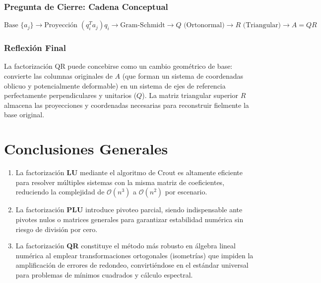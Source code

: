 \documentclass[11pt,a4paper]{article}
\theoremstyle{definition}
\theoremstyle{remark}
\begin{document}
\subsubsection{Pregunta de Cierre: Cadena Conceptual}
\begin{equation}
    \boxed{\text{Base } \{a_j\}} \longrightarrow 
    \boxed{\text{Proyección } (q_i^T a_j)q_i} \longrightarrow 
    \boxed{\text{Gram-Schmidt}} \longrightarrow 
    \boxed{Q \text{ (Ortonormal)}} \longrightarrow 
    \boxed{R \text{ (Triangular)}} \longrightarrow 
    \boxed{A = QR}
\end{equation}

\subsubsection{Reflexión Final}
La factorización QR puede concebirse como un cambio geométrico de base: convierte las columnas originales de $A$ (que forman un sistema de coordenadas oblicuo y potencialmente deformable) en un sistema de ejes de referencia perfectamente perpendiculares y unitarios ($Q$). La matriz triangular superior $R$ almacena las proyecciones y coordenadas necesarias para reconstruir fielmente la base original.

\section{Conclusiones Generales}
\begin{enumerate}
    \item La factorización \textbf{LU} mediante el algoritmo de Crout es altamente eficiente para resolver múltiples sistemas con la misma matriz de coeficientes, reduciendo la complejidad de $\mathcal{O}(n^3)$ a $\mathcal{O}(n^2)$ por escenario.
    \item La factorización \textbf{PLU} introduce pivoteo parcial, siendo indispensable ante pivotes nulos o matrices generales para garantizar estabilidad numérica sin riesgo de división por cero.
    \item La factorización \textbf{QR} constituye el método más robusto en álgebra lineal numérica al emplear transformaciones ortogonales (isometrías) que impiden la amplificación de errores de redondeo, convirtiéndose en el estándar universal para problemas de mínimos cuadrados y cálculo espectral.
\end{enumerate}
\end{document}
